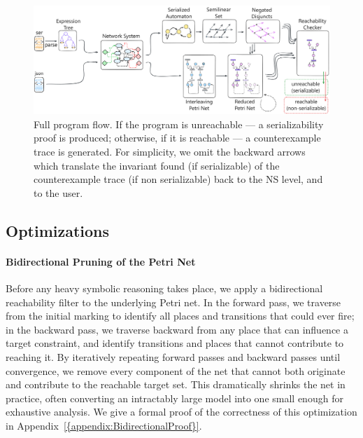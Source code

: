 \begin{figure}[htbp]
	\centering
	\includegraphics[width=1.0\textwidth]{plots/full_program_flow.pdf}
	\caption{Full program flow. If the program is unreachable --- a serializability proof is produced; otherwise, if it is reachable --- a counterexample trace is generated.
	For simplicity, we omit the backward arrows which translate the invariant found (if serializable) of the counterexample trace (if non serializable) back to the NS level, and to the user.}
	\label{fig:full_program_flow}
\end{figure}


\subsection{Optimizations}

\paragraph{Bidirectional Pruning of the Petri Net}
Before any heavy symbolic reasoning takes place, we apply a bidirectional reachability filter to the underlying Petri net.  In the forward pass, we traverse from the initial marking to identify all places and transitions that could ever fire; in the backward pass, we traverse backward from any place that can influence a target constraint, and identify transitions and places that cannot contribute to reaching it.  By iteratively repeating forward passes and backward passes until convergence, we remove every component of the net that cannot both originate and contribute to the reachable target set.  This dramatically shrinks the net in practice, often converting an intractably large model into one small enough for exhaustive analysis.
%
We give a formal proof of the correctness of this optimization in Appendix~\ref{{appendix:BidirectionalProof}}.

